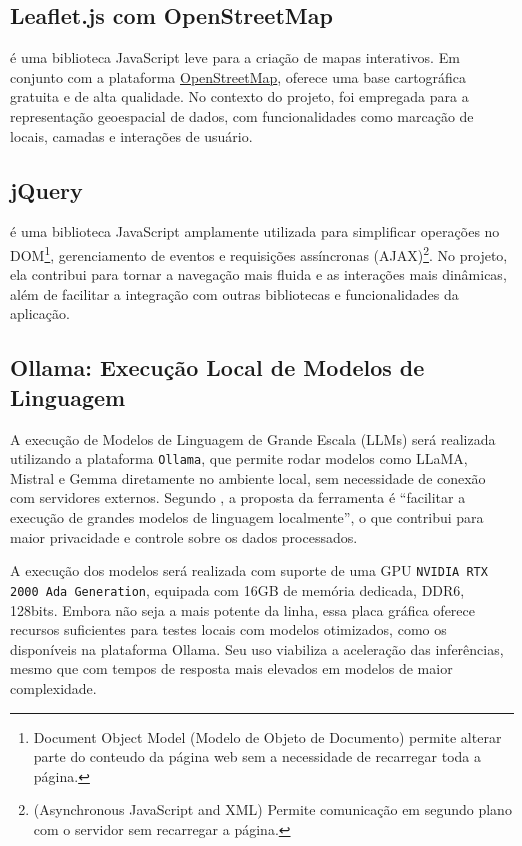 \subsection{Leaflet.js com OpenStreetMap}
\par {} é uma biblioteca JavaScript leve para a criação de mapas interativos. Em conjunto com a plataforma \href{https://www.openstreetmap.org/#map=7/-26.613/-50.746}{OpenStreetMap}, oferece uma base cartográfica gratuita e de alta qualidade. No contexto do projeto, foi empregada para a representação geoespacial de dados, com funcionalidades como marcação de locais, camadas e interações de usuário.

\subsection{jQuery}\label{jQuery}
\par {} é uma biblioteca JavaScript amplamente utilizada para simplificar operações no DOM\footnote{Document Object Model (Modelo de Objeto de Documento) permite alterar parte do conteudo da página web sem a necessidade de recarregar toda a página.}, gerenciamento de eventos e requisições assíncronas (AJAX)\footnote{(Asynchronous JavaScript and XML) Permite comunicação em segundo plano com o servidor sem recarregar a página.}. No projeto, ela contribui para tornar a navegação mais fluida e as interações mais dinâmicas, além de facilitar a integração com outras bibliotecas e funcionalidades da aplicação.

\subsection{Ollama: Execução Local de Modelos de Linguagem}
\par A execução de Modelos de Linguagem de Grande Escala (LLMs) será realizada utilizando a plataforma \texttt{Ollama}, que permite rodar modelos como LLaMA, Mistral e Gemma diretamente no ambiente local, sem necessidade de conexão com servidores externos. Segundo , a proposta da ferramenta é “facilitar a execução de grandes modelos de linguagem localmente”, o que contribui para maior privacidade e controle sobre os dados processados.
\par A execução dos modelos será realizada com suporte de uma GPU \texttt{NVIDIA RTX 2000 Ada Generation}, equipada com 16GB de memória dedicada, DDR6, 128bits. Embora não seja a mais potente da linha, essa placa gráfica oferece recursos suficientes para testes locais com modelos otimizados, como os disponíveis na plataforma Ollama. Seu uso viabiliza a aceleração das inferências, mesmo que com tempos de resposta mais elevados em modelos de maior complexidade.


